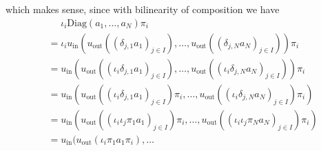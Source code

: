 
which makes sense, since with bilinearity of composition we have
\begin{align}
&\phantom{= }\iota_{i} \mathrm{Diag}(a_{1},\dots,a_{N}) \pi_{i}\\
&= \iota_{i} u_{\text{in}}(
u_{\text{out}}((\delta_{j,1}a_{1})_{j \in I}), \dots, u_{\text{out}}((\delta_{j,N}a_{N})_{j \in I})
) \pi_{i} \\
&= u_{\text{in}}(
u_{\text{out}}((\iota_{i} \delta_{j,1}a_{1})_{j \in I}), \dots, u_{\text{out}}((\iota_{i} \delta_{j,N}a_{N})_{j \in I})
) \pi_{i} \\
&= u_{\text{in}}( u_{\text{out}}((\iota_{i} \delta_{j,1}a_{1})_{j \in I}) \pi_{i} , \dots, u_{\text{out}}((\iota_{i} \delta_{j,N}a_{N})_{j \in I}) \pi_{i}
) \\
&= u_{\text{in}}( u_{\text{out}}((\iota_{i} \iota_{j} \pi_{1} a_{1})_{j \in I}) \pi_{i} , \dots, u_{\text{out}}((\iota_{i} \iota_{j} \pi_{N} a_{N})_{j \in I})
\pi_{i}) \\
&= u_{\text{in}}( u_{\text{out}}(\iota_{i} \pi_{1} a_{1}\pi_{i}),\dots
\end{align}